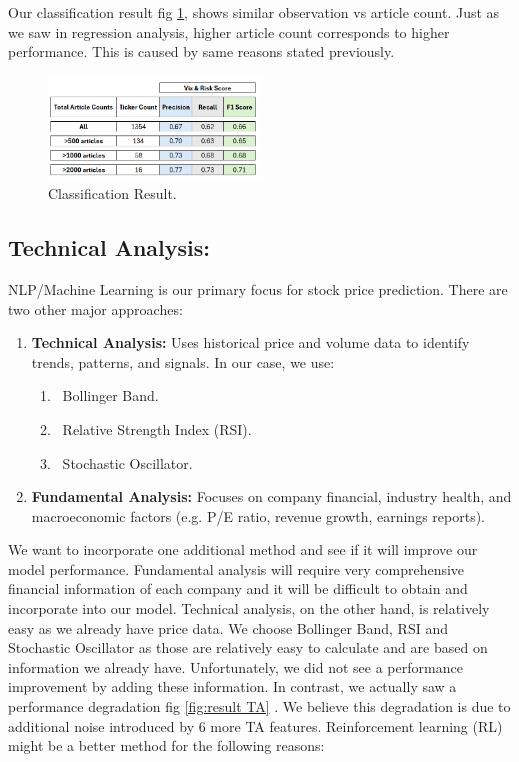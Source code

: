 \documentclass[twocolumn]{article}
\begin{document}
Our classification result fig \ref{fig:classificait result}, shows similar observation vs article count. Just as we saw in regression analysis, higher article count corresponds to higher performance. This is caused by same reasons stated previously.

\begin{figure}[ht]
    \centering
    \includegraphics[width=0.5\textwidth]{classification result.png}
    \caption{Classification Result.}
    \label{fig:classificait result}
\end{figure}

\subsection{Technical Analysis:}
NLP/Machine Learning is our primary focus for stock price prediction. There are two other major approaches:
\begin{enumerate}
    \item \textbf{Technical Analysis:} Uses historical price and volume data to identify trends, patterns, and signals. In our case, we use:
        \begin{enumerate}
            \item \ Bollinger Band.
            \item \ Relative Strength Index (RSI).
            \item \ Stochastic Oscillator. 
        \end{enumerate}
    \item \textbf{Fundamental Analysis:} Focuses on company financial, industry health, and macroeconomic factors (e.g. P/E ratio, revenue growth, earnings reports). 
\end{enumerate}

We want to incorporate one additional method and see if it will improve our model performance. Fundamental analysis will require very comprehensive financial information of each company and it will be difficult to obtain and incorporate into our model. Technical analysis, on the other hand, is relatively easy as we already have price data. We choose Bollinger Band, RSI and Stochastic Oscillator as those are relatively easy to calculate and are based on information we already have. Unfortunately, we did not see a performance improvement by adding these information. In contrast, we actually saw a performance degradation fig \ref{fig:result TA} . We believe this degradation is due to additional noise introduced by 6 more TA features. Reinforcement learning (RL) might be a better method for the following reasons:
\end{document}
